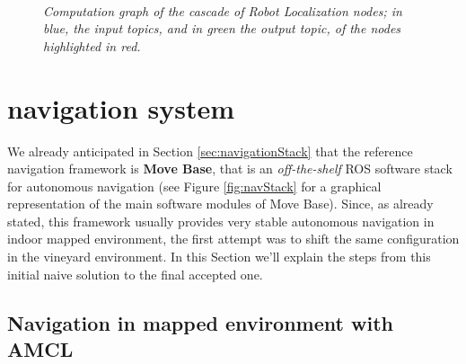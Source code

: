 \begin{figure}
	\centering
	 \\
	\caption{\textit{Computation graph of the cascade of Robot Localization nodes; in blue, the input topics, and in green the output topic, of the nodes highlighted in red.}}
	\label{fig:cascadeRobotLocalization}
\end{figure}


\section{navigation system}\label{sec:navigationSystem}

We already anticipated in Section \ref{sec:navigationStack} that the reference navigation framework is \textbf{Move Base}, that is an \textit{off-the-shelf} \ac{ROS} software stack for autonomous navigation (see Figure \ref{fig:navStack} for a graphical representation of the main software modules of Move Base). Since, as already stated, this framework usually provides very stable autonomous navigation in indoor mapped environment, the first attempt was to shift the same configuration in the vineyard environment. 
In this Section we'll explain the steps from this initial naive solution to the final accepted one.

\subsection{Navigation in mapped environment with AMCL}

